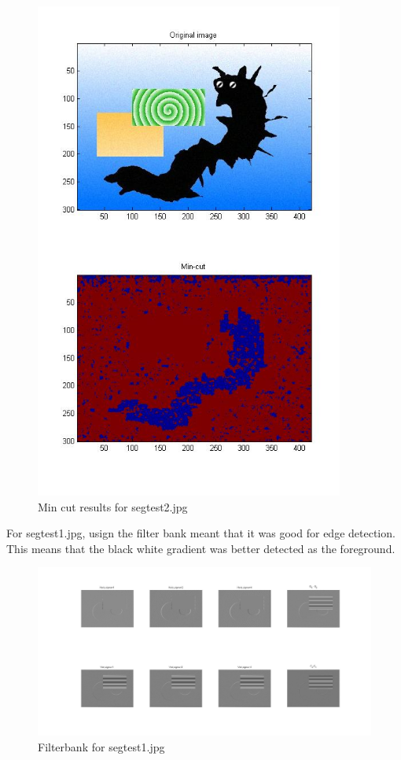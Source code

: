 \documentclass[11pt,psfig]{article}
\begin{document}
\begin{figure}[H]
\centering
\includegraphics[width=4in]{prob5plotB_1.jpg}
\caption{Min cut results for segtest2.jpg}
\end{figure}

For segtest1.jpg, usign the filter bank meant that it was good for edge detection. This means that the black white gradient was better detected as the foreground. 

\begin{figure}[H]
\centering
\includegraphics[width=6in]{prob5plotB_2_filter.jpg}
\caption{Filterbank for segtest1.jpg}
\end{figure}
\end{document}
